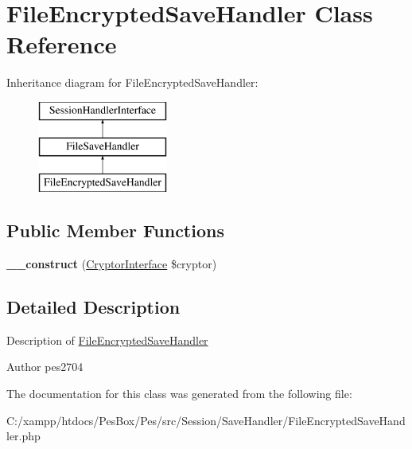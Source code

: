 \hypertarget{class_pes_1_1_session_1_1_save_handler_1_1_file_encrypted_save_handler}{}\section{File\+Encrypted\+Save\+Handler Class Reference}
\label{class_pes_1_1_session_1_1_save_handler_1_1_file_encrypted_save_handler}
Inheritance diagram for File\+Encrypted\+Save\+Handler\+:\begin{figure}[H]
\begin{center}
\leavevmode
\includegraphics[height=3.000000cm]{class_pes_1_1_session_1_1_save_handler_1_1_file_encrypted_save_handler}
\end{center}
\end{figure}
\subsection*{Public Member Functions}
\begin{DoxyCompactItemize}
\item 
\mbox{\label{class_pes_1_1_session_1_1_save_handler_1_1_file_encrypted_save_handler_acd7d64d36acc95abb63417e3e6df2138}} 
{\bfseries \+\_\+\+\_\+construct} (\mbox{\hyperlink{interface_pes_1_1_security_1_1_cryptor_1_1_cryptor_interface}{Cryptor\+Interface}} \$cryptor)
\end{DoxyCompactItemize}


\subsection{Detailed Description}
Description of \mbox{\hyperlink{class_pes_1_1_session_1_1_save_handler_1_1_file_encrypted_save_handler}{File\+Encrypted\+Save\+Handler}}

\begin{DoxyAuthor}{Author}
pes2704 
\end{DoxyAuthor}


The documentation for this class was generated from the following file\+:\begin{DoxyCompactItemize}
\item 
C\+:/xampp/htdocs/\+Pes\+Box/\+Pes/src/\+Session/\+Save\+Handler/File\+Encrypted\+Save\+Handler.\+php\end{DoxyCompactItemize}
